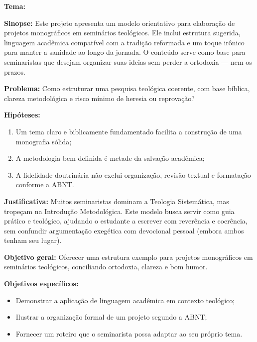 \documentclass[12pt, openright, oneside, a4paper, english, brazil]{abntex2}
\begin{document}




\newpage
\pagestyle{plain}
\renewcommand{\baselinestretch}{1.5}
\normalsize

\noindent
\textbf{Tema:} \imprimirtitulo

\noindent
\textbf{Sinopse:} Este projeto apresenta um modelo orientativo para elaboração de projetos monográficos em seminários teológicos. Ele inclui estrutura sugerida, linguagem acadêmica compatível com a tradição reformada e um toque irônico para manter a sanidade ao longo da jornada. O conteúdo serve como base para seminaristas que desejam organizar suas ideias sem perder a ortodoxia — nem os prazos.

\noindent
\textbf{Problema:} Como estruturar uma pesquisa teológica coerente, com base bíblica, clareza metodológica e risco mínimo de heresia ou reprovação?

\noindent
\textbf{Hipóteses:}
\begin{enumerate}
  \item Um tema claro e biblicamente fundamentado facilita a construção de uma monografia sólida;
  \item A metodologia bem definida é metade da salvação acadêmica;
  \item A fidelidade doutrinária não exclui organização, revisão textual e formatação conforme a ABNT.
\end{enumerate}

\noindent
\textbf{Justificativa:} Muitos seminaristas dominam a Teologia Sistemática, mas tropeçam na Introdução Metodológica. Este modelo busca servir como guia prático e teológico, ajudando o estudante a escrever com reverência e coerência, sem confundir argumentação exegética com devocional pessoal (embora ambos tenham seu lugar).

\noindent
\textbf{Objetivo geral:} Oferecer uma estrutura exemplo para projetos monográficos em seminários teológicos, conciliando ortodoxia, clareza e bom humor.

\noindent
\textbf{Objetivos específicos:}
\begin{itemize}
  \item Demonstrar a aplicação de linguagem acadêmica em contexto teológico;
  \item Ilustrar a organização formal de um projeto segundo a ABNT;
  \item Fornecer um roteiro que o seminarista possa adaptar ao seu próprio tema.
\end{itemize}
\end{document}
